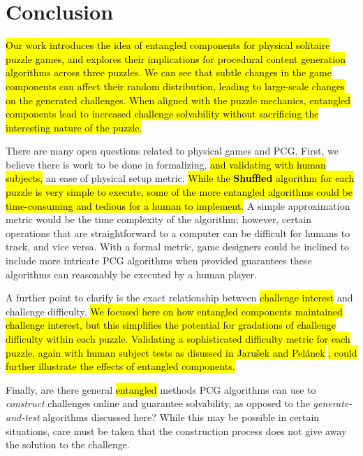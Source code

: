 \documentclass[journal]{IEEEtran}
\begin{document}

\section{Conclusion}   \label{sec:Conclusion}

\noindent
\hl{Our work introduces the idea of entangled components for physical solitaire puzzle games, and explores their implications for procedural content generation algorithms across three puzzles. We can see that subtle changes in the game components can affect their random distribution, leading to large-scale changes on the generated challenges. When aligned with the puzzle mechanics, entangled components lead to increased challenge solvability without sacrificing the interesting nature of the puzzle.}

There are many open questions related to physical games and PCG. First, we believe there is work to be done in formalizing, \hl{and validating with human subjects,} an ease of physical setup metric. \hl{While the \textbf{Shuffled} algorithm for each puzzle is very simple to execute, some of the more entangled algorithms could be time-consuming and tedious for a human to implement.} A simple approximation metric would be the time complexity of the algorithm; however, certain operations that are straightforward to a computer can be difficult for humans to track, and vice versa. With a formal metric, game designers could be inclined to include more intricate PCG algorithms when provided guarantees these algorithms can reasonably be executed by a human player.

A further point to clarify is the exact relationship between \hl{challenge interest} and challenge difficulty. \hl{We focused here on how entangled components maintained challenge interest, but this simplifies the potential for gradations of challenge difficulty within each puzzle. Validating a sophisticated difficulty metric for each puzzle, again with human subject tests as disussed in Jaru{\v{s}}ek and Pel{\'a}nek} \cite{jaruvsek2011determines}
\hl{, could further illustrate the effects of entangled components.}


Finally, are there general \hl{entangled} methods PCG algorithms can use to {\it construct} challenges online and guarantee solvability, as opposed to the {\it generate-and-test} algorithms discussed here? While this may be possible in certain situations, 
care must be taken that the construction process does not give away the solution to the challenge.
\end{document}
